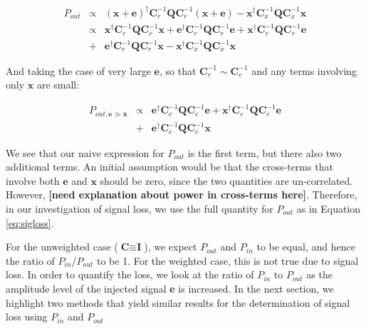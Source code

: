 \documentclass[preprint2,numberedappendix,tighten,twocolappendix]{aastex6}  %
\newcommand{\cc}[1]{{\color{purple} \textbf{[#1]}}}
\begin{document}
\begin{eqnarray}
P_{out} &\propto& (\textbf{x}+\textbf{e})^{\dagger}\textbf{C}_{r}^{-1}\textbf{Q}\textbf{C}_{r}^{-1}(\textbf{x}+\textbf{e}) - \textbf{x}^{\dagger}\textbf{C}_{x}^{-1}\textbf{Q}\textbf{C}_{x}^{-1}\textbf{x} \nonumber \\
&\propto& \textbf{x}^{\dagger}\textbf{C}_{r}^{-1}\textbf{Q}\textbf{C}_{r}^{-1}\textbf{x} + \textbf{e}^{\dagger}\textbf{C}_{r}^{-1}\textbf{Q}\textbf{C}_{r}^{-1}\textbf{e} + \textbf{x}^{\dagger}\textbf{C}_{r}^{-1}\textbf{Q}\textbf{C}_{r}^{-1}\textbf{e} \nonumber \\
&+& \textbf{e}^{\dagger}\textbf{C}_{r}^{-1}\textbf{Q}\textbf{C}_{r}^{-1}\textbf{x} - \textbf{x}^{\dagger}\textbf{C}_{x}^{-1}\textbf{Q}\textbf{C}_{x}^{-1}\textbf{x} \nonumber 
\end{eqnarray}

And taking the case of very large $\textbf{e}$, so that $\textbf{C}_{r}^{-1} \sim \textbf{C}_{e}^{-1}$ and any terms involving only $\textbf{x}$ are small:

\begin{eqnarray}
P_{out, \textbf{e} \gg \textbf{x}} &\propto& \textbf{e}^{\dagger}\textbf{C}_{e}^{-1}\textbf{Q}\textbf{C}_{e}^{-1}\textbf{e} + \textbf{x}^{\dagger}\textbf{C}_{e}^{-1}\textbf{Q}\textbf{C}_{e}^{-1}\textbf{e} \nonumber \\
&+& \textbf{e}^{\dagger}\textbf{C}_{e}^{-1}\textbf{Q}\textbf{C}_{e}^{-1}\textbf{x}
\end{eqnarray}

We see that our naive expression for $P_{out}$ is the first term, but there also two additional terms. An initial assumption would be that the cross-terms that involve both $\textbf{e}$ and $\textbf{x}$ should be zero, since the two quantities are un-correlated. However, \cc{need explanation about power in cross-terms here}. Therefore, in our investigation of signal loss, we use the full quantity for $P_{out}$ as in Equation \ref{eq:sigloss}.

For the unweighted case ($\textbf{C} \equiv \textbf{I}$), we expect $P_{out}$ and $P_{in}$ to be equal, and hence the ratio of $P_{in} / P_{out}$ to be 1. For the weighted case, this is not true due to signal loss. In order to quantify the loss, we look at the ratio of $P_{in}$ to $P_{out}$ as the amplitude level of the injected signal \textbf{e} is increased. In the next section, we highlight two methods that yield similar results for the determination of signal loss using $P_{in}$ and $P_{out}$
\end{document}
